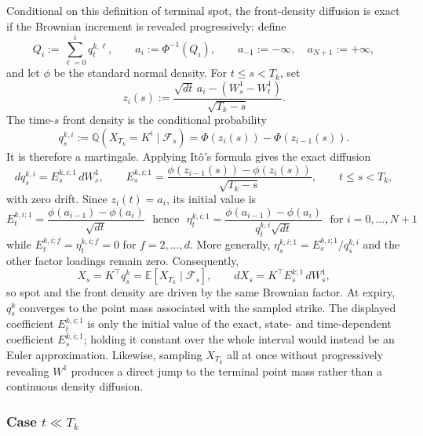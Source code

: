 \documentclass[smallextended,envcountsame,envcountsect]{svjour3}
\newcommand{\Q}{\mathbb Q}
\begin{document}
  Conditional on this definition of terminal spot, the front-density
  diffusion is exact if the Brownian increment is revealed progressively:
  define
  \[
    Q_i:=\sum_{\ell=0}^i q_t^{k,\ell},
    \qquad
    a_i:=\Phi^{-1}(Q_i),
    \qquad
    a_{-1}:=-\infty,\quad a_{N+1}:=+\infty,
  \]
  and let $\phi$ be the standard normal density. For $t\leq s<T_k$, set
  \[
    z_i(s):=
      \frac{\sqrt{dt}\,a_i-(W_s^1-W_t^1)}{\sqrt{T_k-s}}.
  \]
  The time-$s$ front density is the conditional probability
  \begin{equation}
    \label{eq:front_density_mw}
    q_s^{k,i}
      :=\Q\!\left(X_{T_k}=K^i\mid\mathcal F_s\right)
      =\Phi\!\left(z_i(s)\right)
       -\Phi\!\left(z_{i-1}(s)\right).
  \end{equation}
  It is therefore a martingale. Applying It\^o's formula gives the exact
  diffusion
  \begin{equation}
    \label{eq:front_absolute_vol_mw}
    dq_s^{k,i}=E_s^{k,i;1}\,dW_s^1,
    \qquad
    E_s^{k,i;1}
      =\frac{\phi(z_{i-1}(s))-\phi(z_i(s))}{\sqrt{T_k-s}},
    \qquad t\leq s<T_k,
  \end{equation}
  with zero drift. Since $z_i(t)=a_i$, its initial value is
  \begin{equation}
    E_t^{k,i;1}
      =\frac{\phi(a_{i-1})-\phi(a_i)}{\sqrt{dt}} \ \ \ \mbox{hence} \ \ \
    \eta_t^{k,i;1}
      =\frac{\phi(a_{i-1})-\phi(a_i)}{q_t^{k,i}\sqrt{dt}}
      \ \ \ \mbox{for $i=0,\ldots,N+1$}
  \end{equation}
  while $E_t^{k,i;f}=\eta_t^{k,i;f}=0$ for $f=2,\ldots,d$.
  More generally, $\eta_s^{k,i;1}=E_s^{k,i;1}/q_s^{k,i}$ and the other
  factor loadings remain zero. Consequently,
  \[
    X_s=K^\top q_s^k
      =\mathbb E\!\left[X_{T_k}\mid\mathcal F_s\right],
    \qquad
    dX_s=K^\top E_s^{k;1}\,dW_s^1,
  \]
  so spot and the front density are driven by the same Brownian factor. At
  expiry, $q_s^k$ converges to the point mass associated with the sampled
  strike. The displayed coefficient $E_t^{k,i;1}$ is only the initial value
  of the exact, state- and time-dependent coefficient $E_s^{k,i;1}$; holding
  it constant over the whole interval would instead be an Euler
  approximation. Likewise, sampling $X_{T_k}$ all at once without
  progressively revealing $W^1$ produces a direct jump to the terminal point
  mass rather than a continuous density diffusion.






  \subsubsection*{Case $t\ll T_k$}
\end{document}

